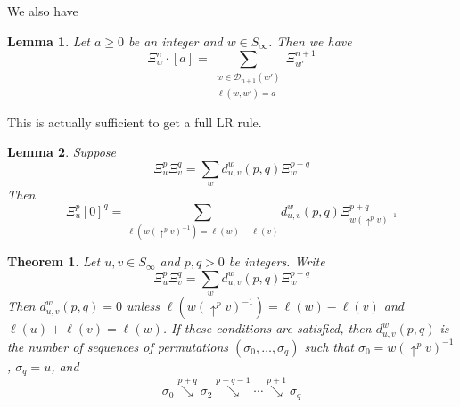 \documentclass{amsart}
\newtheorem{lemma}{Lemma}[subsection]
\newtheorem{theorem}{Theorem}[section]
\theoremstyle{definition}
\theoremstyle{remark}
\numberwithin{equation}{subsection}
\newcommand{\shup}{{\uparrow}}
\newcommand{\downvar}[1]{\stackrel{#1}{\searrow}}
\newcommand{\dsch}{\ensuremath{\Xi}}
\begin{document}
We also have
\begin{lemma} \label{lemma:dpieriend}
Let $a\geq 0$ be an integer and $w\in S_\infty$. Then we have
$$\dsch_{w}^{n}\cdot [a] = \sum_{\substack{w\in\mathcal{D}_{n+1}(w')\\\ell(w,w')=a}} \dsch_{w'}^{n+1}$$
\end{lemma}


This is actually sufficient to get a full LR rule.

\begin{lemma}
Suppose
$$\dsch_u^p\dsch_v^q=\sum_{w}d_{u,v}^w(p,q)\dsch_w^{p+q}$$
Then
$$\dsch_u^p[0]^q=\sum_{\ell(w(\shup^{p}v)^{-1})=\ell(w)-\ell(v)}d_{u,v}^w(p,q)\dsch_{w(\shup^{p}v)^{-1}}^{p+q}$$
\end{lemma}

\begin{theorem} \label{theorem:LRdual}
Let $u,v\in S_\infty$ and $p,q>0$ be integers. Write
$$\dsch_u^p\dsch_v^q = \sum_w d_{u,v}^w(p,q)\dsch_w^{p+q}$$
Then $d_{u,v}^w(p,q)=0$ unless $\ell(w(\shup^{p}v)^{-1}) = \ell(w)-\ell(v)$ and $\ell(u)+\ell(v)=\ell(w)$. If these conditions are satisfied, then $d_{u,v}^w(p,q)$ is the number of sequences of permutations $(\sigma_0,\ldots,\sigma_q)$ such that $\sigma_0 = w(\shup^{p}v)^{-1}$, $\sigma_q = u$, and
$$\sigma_0\downvar{p+q}\sigma_2\downvar{p+q-1}\cdots \downvar{p+1}\sigma_{q}$$
\end{theorem}
\end{document}
